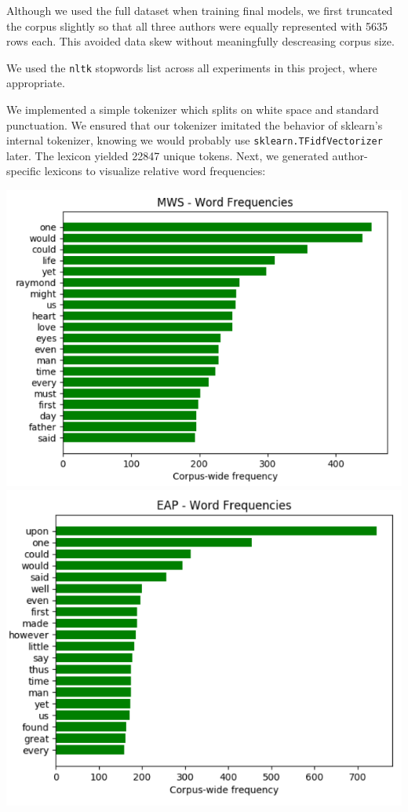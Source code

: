\documentclass[8pt]{article}
\begin{document}
Although we used the full dataset when training final models, we first truncated the corpus slightly so that all three authors were equally represented with 5635 rows each. This avoided data skew without meaningfully descreasing corpus size. 

We used the \texttt{nltk} stopwords list across all experiments in this project, where appropriate.

We implemented a simple tokenizer which splits on white space and standard punctuation. We ensured that our tokenizer imitated the behavior of sklearn's internal tokenizer, knowing we would probably use \texttt{sklearn.TFidfVectorizer} later. The lexicon yielded 22847 unique tokens. Next, we generated author-specific lexicons to visualize relative word frequencies:

\includegraphics[scale=.40, center]{images/word_freq_mws.png}
\vskip 0.2in
\includegraphics[scale=.40, center]{images/word_freq_eap.png}
\end{document}
